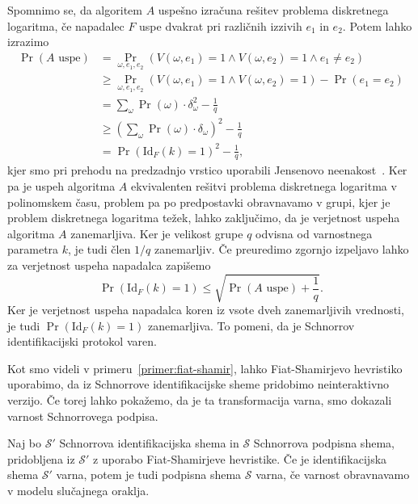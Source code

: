\begin{dokaz}
    Spomnimo se, da algoritem $A$ uspešno izračuna rešitev problema diskretnega logaritma, če napadalec
    $F$ uspe dvakrat pri različnih izzivih $e_1$ in $e_2$. Potem lahko izrazimo
    \begin{align*}
        \Pr(A \text{ uspe}) &=
            \Pr_{\omega, e_1, e_2}(V(\omega, e_1) = 1 \land V(\omega, e_2) = 1 \land e_1 \neq e_2) \\
                                  &\geq \Pr_{\omega, e_1, e_2}(V(\omega, e_1) = 1 \land V(\omega, e_2) = 1) - \Pr(e_1 = e_2) \\
                                  &= \sum_{\omega} \Pr(\omega) \cdot \delta_{\omega}^2 - \frac{1}{q} \\
                                  &\geq (\sum_{\omega} \Pr(\omega) \cdot \delta_{\omega})^2 - \frac{1}{q} \\
                                  &= \Pr(\text{Id}_F(k) = 1)^2 - \frac{1}{q},
    \end{align*}
    kjer smo pri prehodu na predzadnjo vrstico uporabili Jensenovo neenakost~\cite{jensen}.
    Ker pa je uspeh algoritma $A$ ekvivalenten rešitvi problema diskretnega logaritma v polinomskem
    času, problem pa po predpostavki obravnavamo v grupi, kjer je problem diskretnega logaritma težek,
    lahko zaključimo, da je verjetnost uspeha algoritma $A$ zanemarljiva. Ker je velikost grupe $q$
    odvisna od varnostnega parametra $k$, je tudi člen $1/q$ zanemarljiv. Če preuredimo zgornjo izpeljavo
    lahko za verjetnost uspeha napadalca zapišemo
    $$
    \Pr(\text{Id}_F(k) = 1) \leq \sqrt{\Pr(A \text{ uspe}) + \frac{1}{q}}.
    $$
    Ker je verjetnost uspeha napadalca koren iz vsote dveh zanemarljivih vrednosti, je tudi
    $\Pr(\text{Id}_F(k) = 1)$ zanemarljiva. To pomeni, da je  Schnorrov identifikacijski protokol varen.
\end{dokaz}

Kot smo videli v primeru~\ref{primer:fiat-shamir}, lahko Fiat-Shamirjevo hevristiko uporabimo, da
iz Schnorrove identifikacijske sheme pridobimo neinteraktivno verzijo. Če torej lahko pokažemo,
da je ta transformacija varna, smo dokazali varnost Schnorrovega podpisa.

\begin{izrek}
\label{izrek:fiat-shamir-sec}
    Naj bo $\mathcal{S'}$ Schnorrova identifikacijska shema in $\mathcal{S}$ Schnorrova podpisna
    shema, pridobljena iz $\mathcal{S'}$ z uporabo Fiat-Shamirjeve hevristike. Če je identifikacijska
    shema $\mathcal{S'}$ varna, potem je tudi podpisna shema $\mathcal{S}$ varna, če varnost
    obravnavamo v modelu slučajnega oraklja.
\end{izrek}

